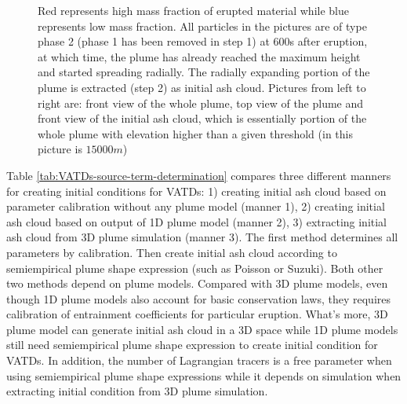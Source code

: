 \begin{figure}[!htb]
\begin{minipage}{.325 \textwidth}
    \end{minipage}%
    \caption{Red represents high mass fraction of erupted material while blue represents low mass fraction. All particles in the pictures are of type phase 2 (phase 1 has been removed in step 1) at 600s after eruption, at which time, the plume has already reached the maximum height and started spreading radially. The radially expanding portion of the plume is extracted (step 2) as initial ash cloud. Pictures from left to right are: front view of the whole plume, top view of the plume and front view of the initial ash cloud, which is essentially portion of the whole plume with elevation higher than a given threshold (in this picture is $15000 m$)}
    \label{fig:Plume-SPH-Pinatubo-ash-cloud}
\end{figure}

Table \ref{tab:VATDs-source-term-determination} compares three different manners for creating initial conditions for VATDs: 1) creating initial ash cloud based on parameter calibration without any plume model (manner 1), 2) creating initial ash cloud based on output of 1D plume model (manner 2), 3) extracting initial ash cloud from 3D plume simulation (manner 3). The first method determines all parameters by calibration. Then create initial ash cloud according to semiempirical plume shape expression (such as Poisson or Suzuki). Both other two methods depend on plume models. Compared with 3D plume models, even though 1D plume models also account for basic conservation laws, they requires calibration of entrainment coefficients for particular eruption. What's more, 3D plume model can generate initial ash cloud in a 3D space while 1D plume models still need semiempirical plume shape expression to create initial condition for VATDs. In addition, the number of Lagrangian tracers is a free parameter when using semiempirical plume shape expressions while it depends on simulation when extracting initial condition from 3D plume simulation.

